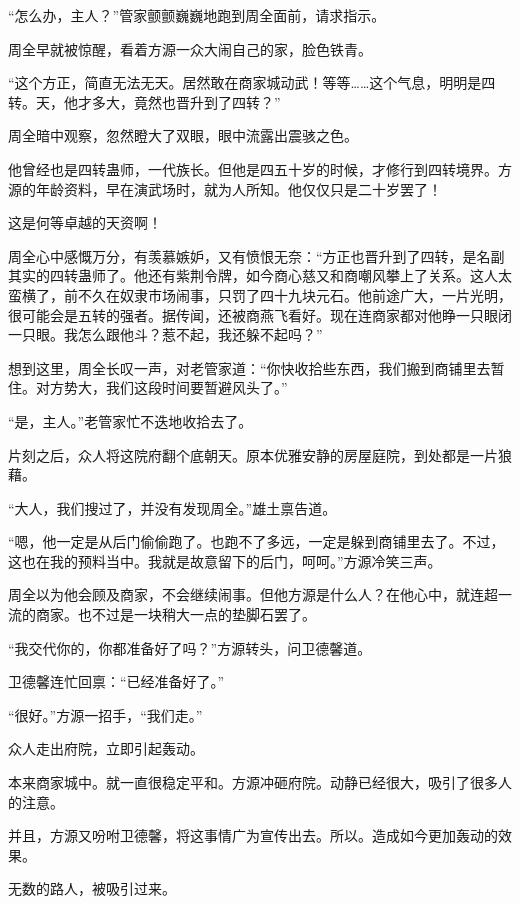 
\begin{this_body}

“怎么办，主人？”管家颤颤巍巍地跑到周全面前，请求指示。

周全早就被惊醒，看着方源一众大闹自己的家，脸色铁青。

“这个方正，简直无法无天。居然敢在商家城动武！等等……这个气息，明明是四转。天，他才多大，竟然也晋升到了四转？”

周全暗中观察，忽然瞪大了双眼，眼中流露出震骇之色。

他曾经也是四转蛊师，一代族长。但他是四五十岁的时候，才修行到四转境界。方源的年龄资料，早在演武场时，就为人所知。他仅仅只是二十岁罢了！

这是何等卓越的天资啊！

周全心中感慨万分，有羡慕嫉妒，又有愤恨无奈：“方正也晋升到了四转，是名副其实的四转蛊师了。他还有紫荆令牌，如今商心慈又和商嘲风攀上了关系。这人太蛮横了，前不久在奴隶市场闹事，只罚了四十九块元石。他前途广大，一片光明，很可能会是五转的强者。据传闻，还被商燕飞看好。现在连商家都对他睁一只眼闭一只眼。我怎么跟他斗？惹不起，我还躲不起吗？”

想到这里，周全长叹一声，对老管家道：“你快收拾些东西，我们搬到商铺里去暂住。对方势大，我们这段时间要暂避风头了。”

“是，主人。”老管家忙不迭地收拾去了。

片刻之后，众人将这院府翻个底朝天。原本优雅安静的房屋庭院，到处都是一片狼藉。

“大人，我们搜过了，并没有发现周全。”雄土禀告道。

“嗯，他一定是从后门偷偷跑了。也跑不了多远，一定是躲到商铺里去了。不过，这也在我的预料当中。我就是故意留下的后门，呵呵。”方源冷笑三声。

周全以为他会顾及商家，不会继续闹事。但他方源是什么人？在他心中，就连超一流的商家。也不过是一块稍大一点的垫脚石罢了。

“我交代你的，你都准备好了吗？”方源转头，问卫德馨道。

卫德馨连忙回禀：“已经准备好了。”

“很好。”方源一招手，“我们走。”

众人走出府院，立即引起轰动。

本来商家城中。就一直很稳定平和。方源冲砸府院。动静已经很大，吸引了很多人的注意。

并且，方源又吩咐卫德馨，将这事情广为宣传出去。所以。造成如今更加轰动的效果。

无数的路人，被吸引过来。


\end{this_body}
